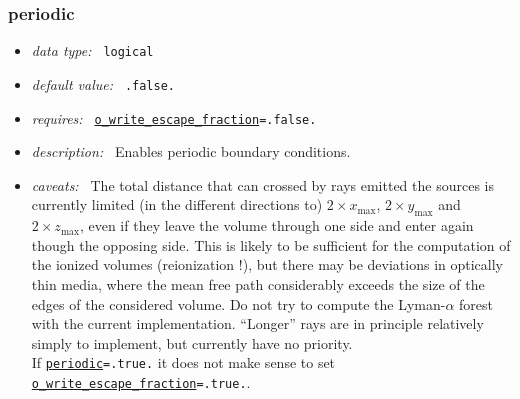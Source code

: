 \documentclass[a4paper,10pt]{article}
\begin{document}
\subsubsection{periodic}
\label{opt:periodic}
\begin{itemize}
 \item \textit{data type:~} \texttt{logical}
 \item \textit{default value:~} \texttt{.false.}
 \item \textit{requires:~} \texttt{\hyperref[opt:owriteescapefraction]{o\_write\_escape\_fraction}=.false.}
 \item \textit{description:~} Enables periodic boundary conditions.  
 \item \textit{caveats:~} The total distance that can crossed by rays emitted 
  the sources is  currently limited (in the different directions to)
  $2 \times x_\mathrm{max}$, $2 \times y_\mathrm{max}$ and  
  $2 \times z_\mathrm{max}$, even if they leave the volume through one side
  and enter again though the opposing side.
  This is likely to be sufficient for the computation of the ionized volumes 
  (reionization !), but there may be deviations in optically thin media, where 
  the mean free path considerably exceeds the size of the edges of the 
  considered volume. Do not try to compute the Lyman-$\alpha$ forest with the 
  current implementation.
  ``Longer'' rays are in principle relatively simply to implement, but currently 
  have no priority.\\
  If \texttt{\hyperref[opt:periodic]{periodic}=.true.} it does not make sense 
  to set 
\texttt{\hyperref[opt:owriteescapefraction]{o\_write\_escape\_fraction}=.true.}.
\end{itemize}
\end{document}
